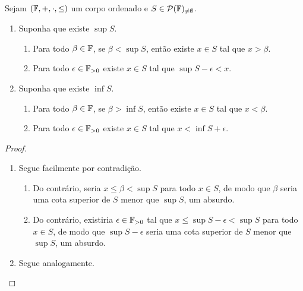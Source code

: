 \begin{lemma} \label{teo.reais:supinf}
    Sejam $(\mathbb{F},+,\cdot, \leq)$ um corpo ordenado e $S \in \mathcal{P}(\mathbb{F})_{\neq \emptyset}$. 
        \begin{enumerate}[leftmargin=*, align=left, label=\textbf{(\alph*)}]
            \item Suponha que existe $\sup{S}$.
                \begin{enumerate}[label=\roman*.]
                    \item Para todo $\beta \in \mathbb{F}$, se $\beta < \sup{S}$, então existe $x \in S$ tal que $x > \beta$.
                    \item Para todo $\epsilon \in \mathbb{F}_{>0}$ existe $x \in S$ tal que $\sup{S} - \epsilon < x$.
                \end{enumerate}
            \item Suponha que existe $\inf{S}$.
                \begin{enumerate}[label=\roman*.]
                    \item Para todo $\beta \in \mathbb{F}$, se $\beta > \inf{S}$, então existe $x \in S$ tal que $x < \beta$.
                    \item Para todo $\epsilon \in \mathbb{F}_{>0}$ existe $x \in S$ tal que $x < \inf{S} + \epsilon$.
                \end{enumerate}
        \end{enumerate}
\end{lemma}

\begin{proof}
    \leavevmode
        \begin{enumerate}[leftmargin=*, align=left, label=\textbf{(\alph*)}]
            \item Segue facilmente por contradição.
                \begin{enumerate}[label=\roman*.]
                    \item Do contrário, seria $x \leq \beta < \sup{S}$ para todo $x \in S$, de modo que $\beta$ seria uma cota superior de $S$ menor que $\sup{S}$, um absurdo. \blackproof
                    \item Do contrário, existiria $\epsilon \in \mathbb{F}_{>0}$ tal que $x \leq \sup{S} - \epsilon < \sup{S}$ para todo $x \in S$, de modo que $\sup{S} - \epsilon$ seria uma cota superior de $S$ menor que $\sup{S}$, um absurdo. \blackproof
                \end{enumerate}
            \item Segue analogamente. \blackproof
        \end{enumerate}
\end{proof}

